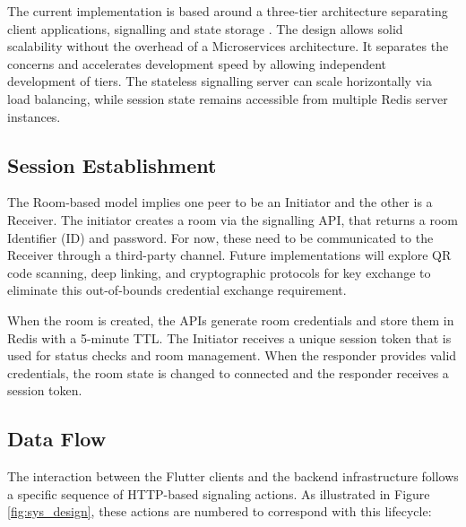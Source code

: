 \documentclass[12pt,a4paper]{article}
\begin{document}
The current implementation is based around a three-tier architecture separating client applications, signalling and state storage \cite{Chia24}. The design allows solid scalability without the overhead of a Microservices architecture. It separates the concerns and accelerates development speed by allowing independent development of tiers. The stateless signalling server can scale horizontally via load balancing, while session state remains accessible from multiple Redis server instances.

\subsection{Session Establishment}

The Room-based model implies one peer to be an Initiator and the other is a Receiver. The initiator creates a room via the signalling API, that returns a room Identifier (ID) and password. For now, these need to be communicated to the Receiver through a third-party channel. Future implementations will explore QR code scanning, deep linking, and cryptographic protocols for key exchange to eliminate this out-of-bounds credential exchange requirement.

When the room is created, the APIs generate room credentials and store them in Redis with a 5-minute TTL. The Initiator receives a unique session token that is used for status checks and room management. When the responder provides valid credentials, the room state is changed to connected and the responder receives a session token.

\subsection{Data Flow}

The interaction between the Flutter clients and the backend infrastructure follows a specific sequence of HTTP-based signaling actions. As illustrated in Figure \ref{fig:sys_design}, these actions are numbered to correspond with this lifecycle:
\end{document}
